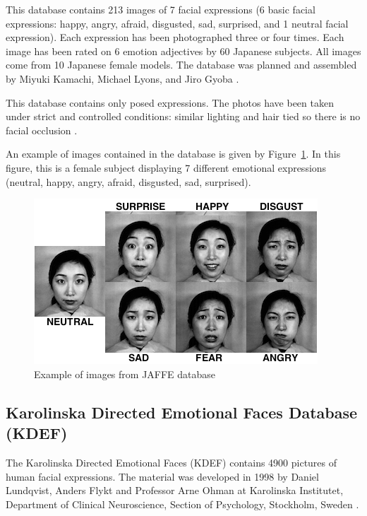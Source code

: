 \vspace{\baselineskip}
\noindent This database contains 213 images of 7 facial expressions (6 basic facial expressions: happy, angry, afraid, disgusted, sad, surprised, and 1 neutral facial expression). Each expression has been photographed three or four times. Each image has been rated on 6 emotion adjectives by 60 Japanese subjects. All images come from 10 Japanese female models.  The database was planned and assembled by Miyuki Kamachi, Michael Lyons, and Jiro Gyoba \cite{JAFFE}.
\newline

\noindent This database contains only posed expressions. The photos have been taken under strict  and controlled conditions: similar lighting and hair tied so there is no facial occlusion \cite{BET12}. 
\newline

\noindent An example of images contained in the database is given by Figure~\ref{jaffe_7facialexpressions}. In this figure, this is a female subject displaying 7 different emotional expressions (neutral, happy, angry, afraid, disgusted, sad, surprised). 
\newline

\begin{figure}[!h]
\begin{center}
\noindent \includegraphics[scale=0.75]{figures/jaffe_7facialexpressions} 
\newline
\caption{Example of images from JAFFE database}
\label{jaffe_7facialexpressions}
\end{center} 
\end{figure}

\subsection{Karolinska Directed Emotional Faces Database (KDEF)}

\vspace{\baselineskip}
\noindent The Karolinska Directed Emotional Faces (KDEF) contains 4900 pictures of human facial expressions. The material was developed in 1998 by Daniel Lundqvist, Anders Flykt and Professor Arne Ohman at Karolinska Institutet, Department of Clinical Neuroscience, Section of Psychology, Stockholm, Sweden \cite{KDEF}.
\newline

